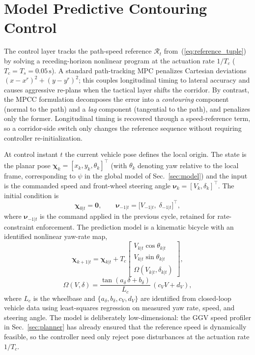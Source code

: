 \documentclass{iopjournal}
\begin{document}
\section{Model Predictive Contouring Control}\label{sec:controller}
The control layer tracks the path-speed reference $\mathcal{R}_t$
from~(\ref{eq:reference_tuple}) by solving a receding-horizon nonlinear
program at the actuation rate $1/T_c$ ($T_c=T_s=0.05\,\mathrm{s}$).
A standard path-tracking MPC penalizes Cartesian deviations
$(x-x^r)^2+(y-y^r)^2$; this couples longitudinal timing to lateral
accuracy and causes aggressive re-plans when the tactical layer shifts
the corridor.  By contrast, the MPCC formulation decomposes the error into
a \emph{contouring} component (normal to the path) and a \emph{lag}
component (tangential to the path), and penalizes only the former.
Longitudinal timing is recovered through a speed-reference term, so a
corridor-side switch only changes the reference sequence without requiring
controller re-initialization.

At control instant $t$ the current vehicle pose defines the local origin.
The state is the planar pose
$\bm{\chi}_k=[x_k,y_k,\theta_k]^\top$
(with $\theta_k$ denoting yaw relative to the local frame, corresponding
to $\psi$ in the global model of Sec.~\ref{sec:model})
and the input is the commanded speed and front-wheel steering angle
$\bm{\nu}_k=[V_k,\delta_k]^\top$.
The initial condition is
\begin{equation}
\bm{\chi}_{0|t}=\bm{0},\qquad
\bm{\nu}_{-1|t}=
\bigl[V_{-1|t},\;\delta_{-1|t}\bigr]^\top,
\label{eq:mpcc_ic}
\end{equation}
where $\bm{\nu}_{-1|t}$ is the command applied in the previous cycle,
retained for rate-constraint enforcement.
The prediction model is a kinematic bicycle with an identified nonlinear
yaw-rate map,
\begin{equation}
\bm{\chi}_{k+1|t}
=\bm{\chi}_{k|t}+T_c
\begin{bmatrix}
V_{k|t}\cos\theta_{k|t}\\[2pt]
V_{k|t}\sin\theta_{k|t}\\[2pt]
\Omega(V_{k|t},\delta_{k|t})
\end{bmatrix},
\label{eq:mpcc_model}
\end{equation}
\begin{equation}
\Omega(V,\delta)=
\frac{\tan(a_\delta\,\delta+b_\delta)}{L_c}\,
(c_V V+d_V),
\label{eq:yaw_rate_map}
\end{equation}
where $L_c$ is the wheelbase and $\{a_\delta,b_\delta,c_V,d_V\}$ are
identified from closed-loop vehicle data using least-squares regression on
measured yaw rate, speed, and steering angle.  The model is deliberately
low-dimensional: the GGV speed profiler in Sec.~\ref{sec:planner} has
already ensured that the reference speed is dynamically feasible, so the
controller need only reject pose disturbances at the actuation rate
$1/T_c$.
\end{document}
